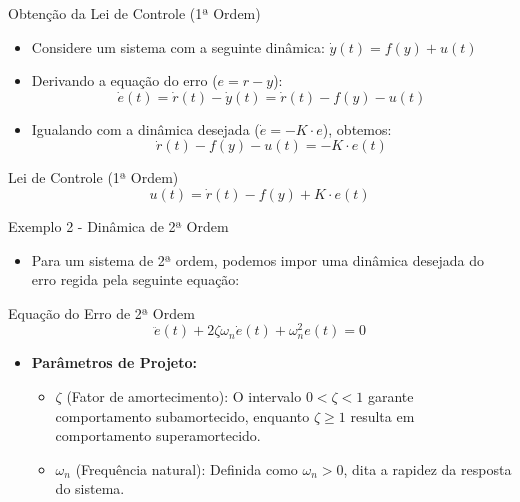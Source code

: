 \documentclass[11pt, aspectratio=169]{beamer}
\begin{document}
\begin{frame}{Obtenção da Lei de Controle (1ª Ordem)}
    \begin{itemize}
        \item Considere um sistema com a seguinte dinâmica: $\dot{y}(t) = f(y) + u(t)$
        \item Derivando a equação do erro ($e = r - y$): 
        \[ \dot{e}(t) = \dot{r}(t) - \dot{y}(t) = \dot{r}(t) - f(y) - u(t) \]
        \item Igualando com a dinâmica desejada ($\dot{e} = -K \cdot e$), obtemos:
        \[ \dot{r}(t) - f(y) - u(t) = -K \cdot e(t) \]
    \end{itemize}
    
    \begin{alertblock}{Lei de Controle (1ª Ordem)}
        \[ u(t) = \dot{r}(t) - f(y) + K \cdot e(t) \]
    \end{alertblock}
\end{frame}

\begin{frame}{Exemplo 2 - Dinâmica de 2ª Ordem}
    \begin{itemize}
        \item Para um sistema de 2ª ordem, podemos impor uma dinâmica desejada do erro regida pela seguinte equação:
    \end{itemize}
    
    \begin{block}{Equação do Erro de 2ª Ordem}
        \[ \ddot{e}(t) + 2\zeta\omega_n \dot{e}(t) + \omega_n^2 e(t) = 0 \]
    \end{block}
    
    \begin{itemize}
        \item \textbf{Parâmetros de Projeto:}
        \begin{itemize}
            \item $\zeta$ (Fator de amortecimento): O intervalo $0 < \zeta < 1$ garante comportamento subamortecido, enquanto $\zeta \geq 1$ resulta em comportamento superamortecido.
            \item $\omega_n$ (Frequência natural): Definida como $\omega_n > 0$, dita a rapidez da resposta do sistema.
        \end{itemize}
    \end{itemize}
\end{frame}
\end{document}
